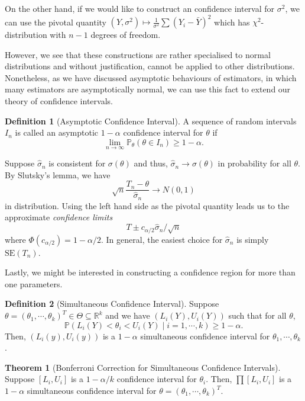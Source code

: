 \documentclass[
]{article}
\theoremstyle{definition}
\newtheorem{theorem}{Theorem}
\theoremstyle{definition}
\newtheorem{definition}{Definition}[section]
\begin{document}
On the other hand, if we would like to construct an confidence interval
for \(\sigma^2\), we can use the pivotal quantity
\((Y, \sigma^2) \mapsto \frac{1}{\sigma^2} \sum(Y_i - \bar{Y})^2\) which
has \(\chi^2\)-distribution with \(n - 1\) degrees of freedom.

However, we see that these constructions are rather specialised to
normal distributions and without justification, cannot be applied to
other distributions. Nonetheless, as we have discussed asymptotic
behaviours of estimators, in which many estimators are asymptotically
normal, we can use this fact to extend our theory of confidence
intervals.

\begin{definition}[Asymptotic Confidence Interval]
  A sequence of random intervals \(I_n\) is called an asymptotic \(1 - \alpha\) 
  confidence interval for \(\theta\) if 
  \[\lim_{n \to \infty} \mathbb{P}_\theta(\theta \in I_n) \ge 1 - \alpha.\]
\end{definition}

Suppose \(\hat{\sigma}_n\) is consistent for \(\sigma(\theta)\) and
thus, \(\hat{\sigma}_n \to \sigma(\theta)\) in probability for all
\(\theta\). By Slutsky's lemma, we have
\[\sqrt{n} \frac{T_n - \theta}{\hat{\sigma}_n} \to N(0, 1)\] in
distribution. Using the left hand side as the pivotal quantity leads us
to the approximate \emph{confidence limits}
\[T \pm c_{\alpha / 2} \hat{\sigma}_n / \sqrt{n}\] where
\(\Phi(c_{\alpha / 2}) = 1 - \alpha / 2\). In general, the easiest
choice for \(\hat{\sigma}_n\) is simply \(\text{SE}(T_n)\).

Lastly, we might be interested in constructing a confidence region for
more than one parameters.

\begin{definition}[Simultaneous Confidence Interval]
  Suppose \(\theta = (\theta_1, \cdots, \theta_k)^T \in \Theta \subseteq \mathbb{R}^k\) 
  and we have \((L_i(Y), U_i(Y))\) such that for all \(\theta\), 
  \[\mathbb{P}(L_i(Y) < \theta_i < U_i(Y) \mid i = 1, \cdots, k) \ge 1 - \alpha.\]
  Then, \((L_i(y), U_i(y))\) is a \(1 - \alpha\) simultaneous confidence interval 
  for \(\theta_1, \cdots, \theta_k\).
\end{definition}

\begin{theorem}[Bonferroni Correction for Simultaneous Confidence Intervals]
  Suppose \([L_i, U_i]\) is a \(1 - \alpha / k\) confidence interval for 
  \(\theta_i\). Then, \(\prod [L_i, U_i]\) is a \(1 - \alpha\) simultaneous 
  confidence interval for \(\theta = (\theta_1, \cdots, \theta_k)^T\).
\end{theorem}
\proof
\end{document}
